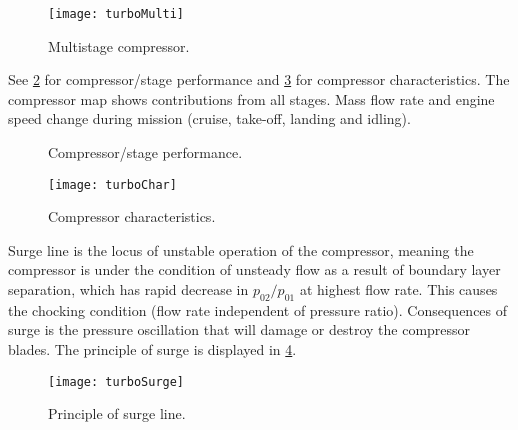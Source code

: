 \begin{figure}[!htb!]
 \centering
    {\texttt{[image: turboMulti]}}
    \caption{\label{FIG_TURBO_MULTI}Multistage compressor.}
\end{figure}

See \cref{FIG_TURBO_PERFORMANCE} for compressor/stage performance and \cref{FIG_TURBO_CHAR} for compressor characteristics. The compressor map shows contributions from all stages. Mass flow rate and engine speed change during mission (cruise, take-off, landing and idling).

\begin{figure}[!htb!]
 \centering
    \quad
    \caption{\label{FIG_TURBO_PERFORMANCE}Compressor/stage performance.}
\end{figure}

\begin{figure}[!htb!]
 \centering
    {\texttt{[image: turboChar]}}
    \caption{\label{FIG_TURBO_CHAR}Compressor characteristics.}
\end{figure}

Surge line is the locus of unstable operation of the compressor, meaning the compressor is under the condition of unsteady flow as a result of boundary layer separation, which has rapid decrease in $p_{02}/p_{01}$ at highest flow rate. This causes the chocking condition (flow rate independent of pressure ratio). Consequences of surge is the pressure oscillation that will damage or destroy the compressor blades. The principle of surge is displayed in \cref{FIG_TURBO_SURGE}.

\begin{figure}[!htb!]
 \centering
    {\texttt{[image: turboSurge]}}
    \caption{\label{FIG_TURBO_SURGE}Principle of surge line.}
\end{figure}

